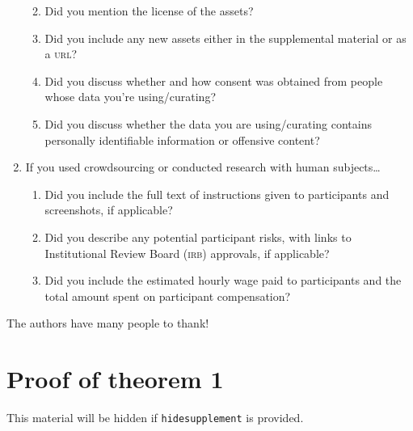\documentclass[11pt]{article}
\begin{document}
\begin{enumerate}
\begin{enumerate}
    \answerTODO{}
  \item Did you mention the license of the assets?
    \answerTODO{}
  \item Did you include any new assets either in the supplemental material or as
    a \textsc{url}?
    \answerTODO{}
  \item Did you discuss whether and how consent was obtained from people whose
    data you're using/curating?
    \answerTODO{}
  \item Did you discuss whether the data you are using/curating contains
    personally identifiable information or offensive content?
    \answerTODO{}
  \end{enumerate}
\item If you used crowdsourcing or conducted research with human subjects\dots
  \begin{enumerate}
  \item Did you include the full text of instructions given to participants and
    screenshots, if applicable?
    \answerTODO{}
  \item Did you describe any potential participant risks, with links to
    Institutional Review Board (\textsc{irb}) approvals, if applicable?
    \answerTODO{}
  \item Did you include the estimated hourly wage paid to participants and the
    total amount spent on participant compensation?
    \answerTODO{}
  \end{enumerate}
\end{enumerate}

\begin{acknowledgements}
  The authors have many people to thank!
\end{acknowledgements}






\appendix

\section{Proof of theorem 1}

This material will be hidden if \texttt{hidesupplement} is provided.
\end{document}
